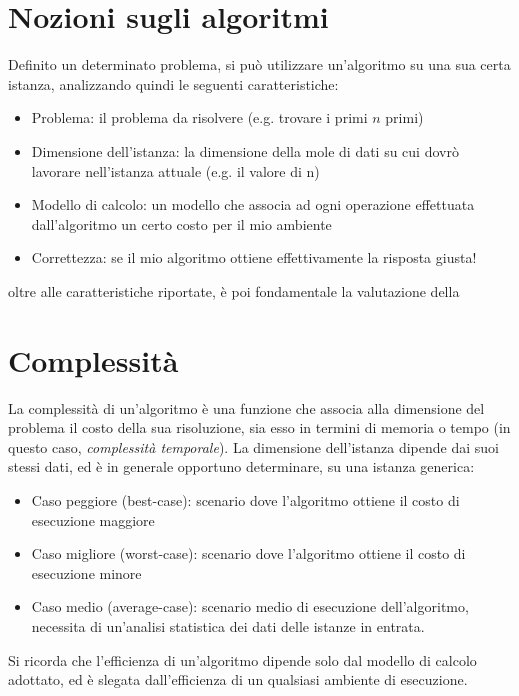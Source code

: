 \documentclass[a4paper,12pt]{article}
\begin{document}
\section{Nozioni sugli algoritmi}
Definito un determinato problema, si può utilizzare un'algoritmo su una sua certa istanza, analizzando
quindi le seguenti caratteristiche:

\begin{itemize}
  \item Problema:
    il problema da risolvere (e.g. trovare i primi $n$ primi)
  \item Dimensione dell'istanza:
    la dimensione della mole di dati su cui dovrò lavorare nell'istanza attuale (e.g. il valore di n)
  \item Modello di calcolo:
    un modello che associa ad ogni operazione effettuata dall'algoritmo un certo costo per il mio ambiente
  \item Correttezza:
    se il mio algoritmo ottiene effettivamente la risposta giusta!
\end{itemize}

oltre alle caratteristiche riportate, è poi fondamentale la valutazione della

\section{Complessità}
La complessità di un'algoritmo è una funzione che associa alla dimensione del problema il costo della sua risoluzione,
sia esso in termini di memoria o tempo (in questo caso, \textit{complessità temporale}). La dimensione dell'istanza
dipende dai suoi stessi dati, ed è in generale opportuno determinare, su una istanza generica:
\begin{itemize}
  \item Caso peggiore (best-case):
    scenario dove l'algoritmo ottiene il costo di esecuzione maggiore
  \item Caso migliore (worst-case):
    scenario dove l'algoritmo ottiene il costo di esecuzione minore
  \item Caso medio (average-case):
    scenario medio di esecuzione dell'algoritmo, necessita di un'analisi statistica dei dati delle istanze in
    entrata.
\end{itemize}

Si ricorda che l'efficienza di un'algoritmo dipende solo dal modello di calcolo adottato, ed è slegata dall'efficienza
di un qualsiasi ambiente di esecuzione.

\par\smallskip
\end{document}
